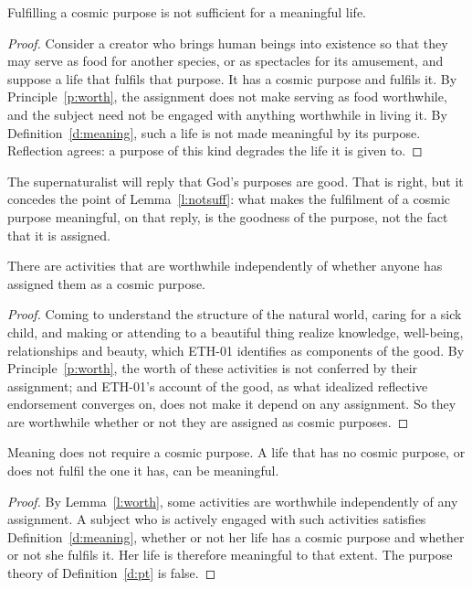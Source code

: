 \documentclass{situationist-preprint}
\begin{document}
\begin{lemma}\label{l:notsuff}
Fulfilling a cosmic purpose is not sufficient for a meaningful life.
\end{lemma}

\begin{proof}
Consider a creator who brings human beings into existence so that they may serve as food for another species, or as spectacles for its amusement, and suppose a life that fulfils that purpose. It has a cosmic purpose and fulfils it. By Principle~\ref{p:worth}, the assignment does not make serving as food worthwhile, and the subject need not be engaged with anything worthwhile in living it. By Definition~\ref{d:meaning}, such a life is not made meaningful by its purpose. Reflection agrees: a purpose of this kind degrades the life it is given to.
\end{proof}

The supernaturalist will reply that God's purposes are good. That is right, but it concedes the point of Lemma~\ref{l:notsuff}: what makes the fulfilment of a cosmic purpose meaningful, on that reply, is the goodness of the purpose, not the fact that it is assigned.

\begin{lemma}\label{l:worth}
There are activities that are worthwhile independently of whether anyone has assigned them as a cosmic purpose.
\end{lemma}

\begin{proof}
Coming to understand the structure of the natural world, caring for a sick child, and making or attending to a beautiful thing realize knowledge, well-being, relationships and beauty, which ETH-01 identifies as components of the good. By Principle~\ref{p:worth}, the worth of these activities is not conferred by their assignment; and ETH-01's account of the good, as what idealized reflective endorsement converges on, does not make it depend on any assignment. So they are worthwhile whether or not they are assigned as cosmic purposes.
\end{proof}

\begin{theorem}\label{t:main}
Meaning does not require a cosmic purpose. A life that has no cosmic purpose, or does not fulfil the one it has, can be meaningful.
\end{theorem}

\begin{proof}
By Lemma~\ref{l:worth}, some activities are worthwhile independently of any assignment. A subject who is actively engaged with such activities satisfies Definition~\ref{d:meaning}, whether or not her life has a cosmic purpose and whether or not she fulfils it. Her life is therefore meaningful to that extent. The purpose theory of Definition~\ref{d:pt} is false.
\end{proof}
\end{document}
